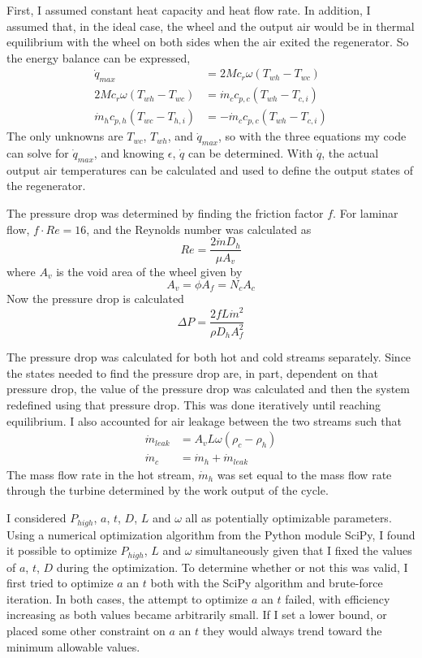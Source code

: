 \documentclass[12pt]{report}
\begin{document}
First, I assumed constant heat capacity and heat flow rate.  In addition, I assumed that, in the ideal case, the wheel and the output air would be in thermal equilibrium with the wheel on both sides when the air exited the regenerator.  So the energy balance can be expressed,
\begin{align}
\dot{q}_{max} &= 2Mc_r \omega (T_{wh} - T_{wc})\\
2Mc_r \omega (T_{wh} - T_{wc})& = \dot{m}_cc_{p,c}(T_{wh} - T_{c,i})\\
\dot{m}_hc_{p,h}(T_{wc} - T_{h,i}) &= -\dot{m}_cc_{p,c}(T_{wh} - T_{c,i})
\end{align}
The only unknowns are $T_{wc}$, $T_{wh}$, and $\dot{q}_{max}$, so with the three equations my code can solve for $\dot{q}_{max}$, and knowing $\epsilon$, $\dot{q}$ can be determined.  With $\dot{q}$, the actual output air temperatures can be calculated and used to define the output states of the regenerator.  

The pressure drop was determined by finding the friction factor $f$.  For laminar flow, $f\cdot Re=16$, and the Reynolds number was calculated as 
\begin{equation}
Re = \frac{2\dot{m}D_h}{\mu A_v}
\end{equation}
where $A_v$ is the void area of the wheel given by
\begin{equation}
A_v = \phi A_f=N_cA_c
\end{equation}
Now the pressure drop is calculated 
\begin{equation}
\Delta P = \frac{2fL\dot{m}^2}{\rho D_hA_f^2}
\end{equation}

The pressure drop was calculated for both hot and cold streams separately.  Since the states needed to find the pressure drop are, in part, dependent on that pressure drop, the value of the pressure drop was calculated and then the system redefined using that pressure drop.  This was done iteratively until reaching equilibrium.  I also accounted for air leakage between the two streams such that 
\begin{align}
\dot{m}_{leak} &= A_vL\omega(\rho_c-\rho_h)\\
\dot{m}_c& = \dot{m}_h+\dot{m}_{leak}
\end{align}
The mass flow rate in the hot stream, $\dot{m}_h$ was set equal to the mass flow rate through the turbine determined by the work output of the cycle. 

I considered $P_{high}$, $a$, $t$, $D$, $L$ and $\omega$ all as potentially optimizable parameters.  Using a numerical optimization algorithm from the Python module SciPy, I found it possible to optimize $P_{high}$, $L$ and $\omega$ simultaneously given that I fixed the values of $a$, $t$, $D$ during the optimization.  To determine whether or not this was valid, I first tried to optimize $a$ an $t$ both with the SciPy algorithm and brute-force iteration.  In both cases, the attempt to optimize $a$ an $t$ failed, with efficiency increasing as both values became arbitrarily small.  If I set a lower bound, or placed some other constraint on $a$ an $t$ they would always trend toward the minimum allowable values.  
\end{document}

